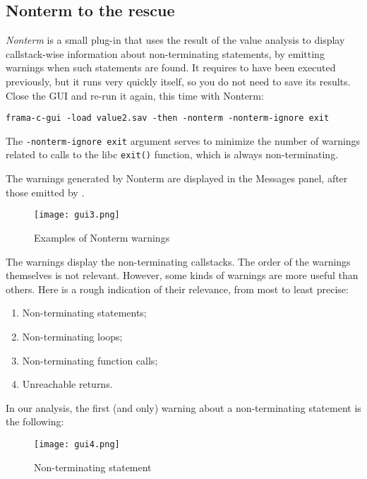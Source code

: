 \subsection{Nonterm to the rescue}\label{nonterm-to-the-rescue}

\emph{Nonterm} is a small plug-in that uses the result of the value
analysis to display callstack-wise information about non-terminating
statements, by emitting warnings when such statements are found. It
requires \Eva{} to have been executed previously, but it runs very quickly
itself, so you do not need to save its results. Close the GUI and re-run
it again, this time with Nonterm:

\begin{verbatim}
frama-c-gui -load value2.sav -then -nonterm -nonterm-ignore exit
\end{verbatim}

The \texttt{-nonterm-ignore\ exit} argument serves to minimize the
number of warnings related to calls to the libc \texttt{exit()}
function, which is always non-terminating.

The warnings generated by Nonterm are displayed in the Messages panel,
after those emitted by \Eva{}.

\begin{figure}
\centering
\texttt{[image: gui3.png]}
\caption{Examples of Nonterm warnings}
\end{figure}

The warnings display the non-terminating callstacks. The order of the
warnings themselves is not relevant. However, some kinds of warnings are
more useful than others. Here is a rough indication of their relevance,
from most to least precise:

\begin{enumerate}
\def\labelenumi{\arabic{enumi}.}

\item
  Non-terminating statements;
\item
  Non-terminating loops;
\item
  Non-terminating function calls;
\item
  Unreachable returns.
\end{enumerate}

In our analysis, the first (and only) warning about a non-terminating
statement is the following:

\begin{figure}
\centering
\texttt{[image: gui4.png]}
\caption{Non-terminating statement}
\end{figure}

